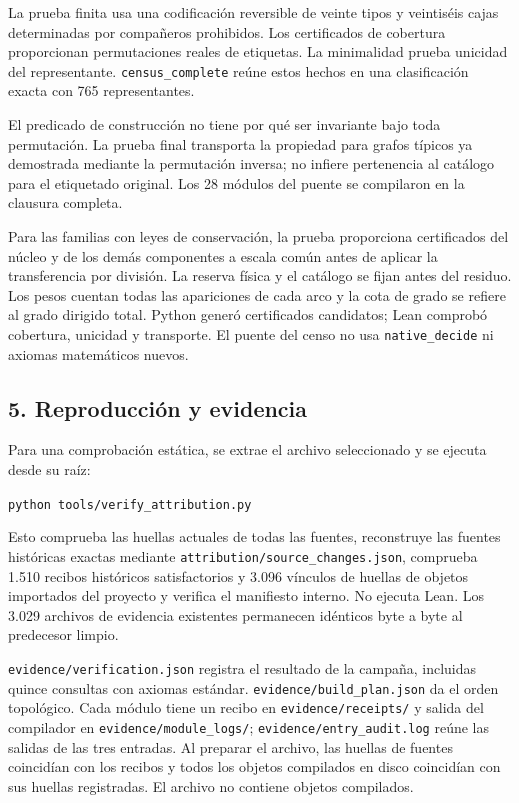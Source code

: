 \documentclass[spanish,11pt,a4paper]{article}
\begin{document}
La prueba finita usa una codificación reversible de veinte tipos y veintiséis cajas determinadas por compañeros prohibidos. Los certificados de cobertura proporcionan permutaciones reales de etiquetas. La minimalidad prueba unicidad del representante. \texttt{census\_\allowbreak{}compl\allowbreak{}ete} reúne estos hechos en una clasificación exacta con 765 representantes.

El predicado de construcción no tiene por qué ser invariante bajo toda permutación. La prueba final transporta la propiedad para grafos típicos ya demostrada mediante la permutación inversa; no infiere pertenencia al catálogo para el etiquetado original. Los 28 módulos del puente se compilaron en la clausura completa.

Para las familias con leyes de conservación, la prueba proporciona certificados del núcleo y de los demás componentes a escala común antes de aplicar la transferencia por división. La reserva física y el catálogo se fijan antes del residuo. Los pesos cuentan todas las apariciones de cada arco y la cota de grado se refiere al grado dirigido total. Python generó certificados candidatos; Lean comprobó cobertura, unicidad y transporte. El puente del censo no usa \texttt{native\_\allowbreak{}decid\allowbreak{}e} ni axiomas matemáticos nuevos.


\subsection{5. Reproducción y evidencia}\label{reproducciuxf3n-y-evidencia}

Para una comprobación estática, se extrae el archivo seleccionado y se ejecuta desde su raíz:

\texttt{python tools\allowbreak{}/\allowbreak{}verify\_\allowbreak{}attr\allowbreak{}ibution.\allowbreak{}py}

Esto comprueba las huellas actuales de todas las fuentes, reconstruye las fuentes históricas exactas mediante \texttt{attribution/\allowbreak{}\allowbreak{}source\_\allowbreak{}chang\allowbreak{}es.\allowbreak{}json}, comprueba 1.510 recibos históricos satisfactorios y 3.096 vínculos de huellas de objetos importados del proyecto y verifica el manifiesto interno. No ejecuta Lean. Los 3.029 archivos de evidencia existentes permanecen idénticos byte a byte al predecesor limpio.

\texttt{evidence/\allowbreak{}ver\allowbreak{}ification.\allowbreak{}js\allowbreak{}on} registra el resultado de la campaña, incluidas quince consultas con axiomas estándar. \texttt{evidence/\allowbreak{}bui\allowbreak{}ld\_\allowbreak{}plan.\allowbreak{}json\allowbreak{}} da el orden topológico. Cada módulo tiene un recibo en \texttt{evidence/\allowbreak{}rec\allowbreak{}eipts/\allowbreak{}} y salida del compilador en \texttt{evidence/\allowbreak{}mod\allowbreak{}ule\_\allowbreak{}logs/\allowbreak{}}; \texttt{evidence/\allowbreak{}ent\allowbreak{}ry\_\allowbreak{}audit.\allowbreak{}log\allowbreak{}} reúne las salidas de las tres entradas. Al preparar el archivo, las huellas de fuentes coincidían con los recibos y todos los objetos compilados en disco coincidían con sus huellas registradas. El archivo no contiene objetos compilados.
\end{document}
